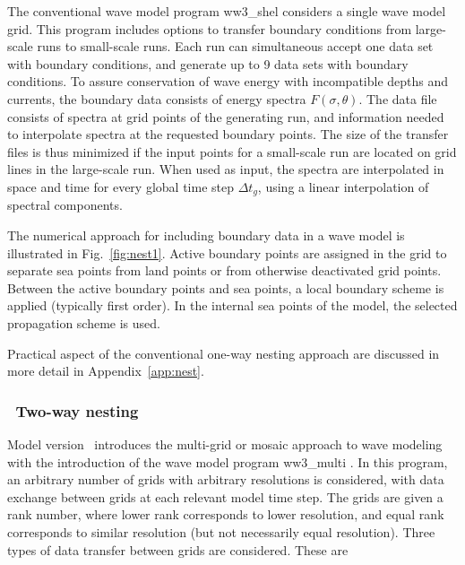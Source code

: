 The conventional wave model program {\file ww3\_shel} considers a single wave
model grid. This program includes options to transfer boundary conditions from
large-scale runs to small-scale runs. Each run can simultaneous accept one
data set with boundary conditions, and generate up to 9 data sets with
boundary conditions. To assure conservation of wave energy with incompatible
depths and currents, the boundary data consists of energy spectra
$F(\sigma,\theta)$. The data file consists of spectra at grid points of the
generating run, and information needed to interpolate spectra at the requested
boundary points. The size of the transfer files is thus minimized if the input
points for a small-scale run are located on grid lines in the large-scale
run. When used as input, the spectra are interpolated in space and time for
every global time step $\Delta t_g$, using a linear interpolation of spectral
components. 

The numerical approach for including boundary data in a wave model is
illustrated in Fig.~\ref{fig:nest1}. Active boundary points are assigned in
the grid to separate sea points from land points or from otherwise deactivated
grid points. Between the active boundary points and sea points, a local
boundary scheme is applied (typically first order). In the internal sea points
of the model, the selected propagation scheme is used.

Practical aspect of the conventional one-way nesting approach are
discussed in more detail in Appendix~\ref{app:nest}.




\vssub
\subsubsection{~Two-way nesting} \label{sub:two_way}
\vssub

Model version \WWver\ introduces the multi-grid or mosaic approach to wave
modeling with the introduction of the wave model program {\file ww3\_multi}
\citep{tol:Vict06a, tol:MMAB07b, tol:OMOD08b}. In this program, an arbitrary
number of grids with arbitrary resolutions is considered, with data exchange
between grids at each relevant model time step. The grids are given a rank
number, where lower rank corresponds to lower resolution, and equal rank
corresponds to similar resolution (but not necessarily equal resolution).
Three types of data transfer between grids are considered. These are

